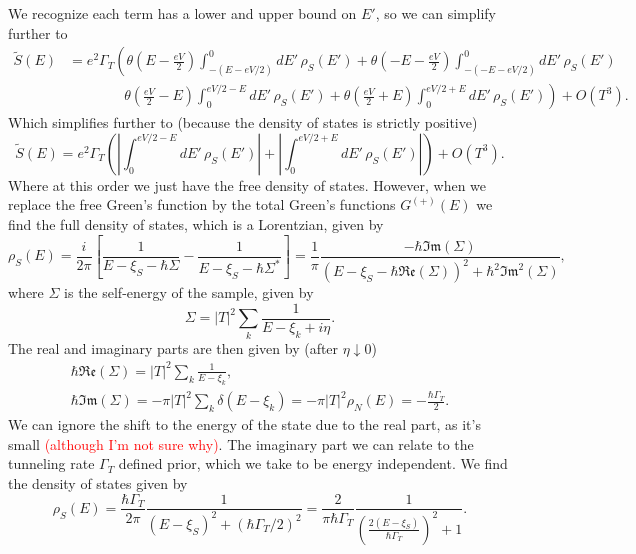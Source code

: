 We recognize each term has a lower and upper bound on $E'$, so we can simplify further to 
\begin{align}
    \tilde{S}(E) &=e^2 \Gamma_T \left(\theta\left(E-\frac{eV}{2}\right)\int_{-(E-eV/2)}^0dE'\,\rho_S(E') + \theta\left(-E-\frac{eV}{2}\right)\int_{-(-E-eV/2)}^0dE'\,\rho_S(E')\right.\nonumber\\ 
    &\left.\qquad\qquad\theta\left(\frac{eV}{2}-E\right)\int_0^{eV/2-E}dE'\,\rho_S(E') + \theta\left(\frac{eV}{2}+E\right)\int_0^{eV/2+E}dE'\,\rho_S(E')\right) + O(T^3).
\end{align}
Which simplifies further to (because the density of states is strictly positive)
\begin{equation}
    \tilde{S}(E) =e^2 \Gamma_T \left(\left|\int_0^{eV/2-E}dE'\,\rho_S(E')\right|+ \left|\int_0^{eV/2+E}dE'\,\rho_S(E')\right|\right)+O(T^3).
\end{equation}
Where at this order we just have the free density of states. However, when we replace the free Green's function by the total Green's functions $G^{(+)}(E)$ we find the full density of states, which is a Lorentzian, given by 
\begin{equation}
    \rho_S(E) = \frac{i}{2\pi}\left[\frac{1}{E-\xi_S-\hbar\Sigma} - \frac{1}{E-\xi_S-\hbar\Sigma^*}\right] = \frac{1}{\pi}\frac{-\hbar\mathfrak{Im}(\Sigma)}{(E-\xi_S-\hbar\mathfrak{Re}(\Sigma))^2+\hbar^2\mathfrak{Im}^2(\Sigma)},
\end{equation}
where $\Sigma$ is the self-energy of the sample, given by
\begin{equation}
    \Sigma = |T|^2 \sum_k\frac{1}{E-\xi_k+i\eta}.
\end{equation}
The real and imaginary parts are then given by (after $\eta \downarrow 0$)
\begin{gather}
    \hbar\mathfrak{Re}(\Sigma) = |T|^2\sum_k\frac{1}{E-\xi_k},\\
    \hbar\mathfrak{Im}(\Sigma) = -\pi|T|^2\sum_k\delta(E-\xi_k) = -\pi|T|^2\rho_N(E) = -\frac{\hbar\Gamma_T}{2}.
\end{gather}
We can ignore the shift to the energy of the state due to the real part, as it's small \textcolor{red}{(although I'm not sure why)}. The imaginary part we can relate to the tunneling rate $\Gamma_T$ defined prior, which we take to be energy independent. We find the density of states given by
\begin{equation}
    \rho_S(E) = \frac{\hbar\Gamma_T}{2\pi}\frac{1}{(E-\xi_S)^2+(\hbar\Gamma_T/2)^2} = \frac{2}{\pi\hbar\Gamma_T}\frac{1}{\left(\frac{2(E-\xi_S)}{\hbar\Gamma_T}\right)^2+1}.
\end{equation}
